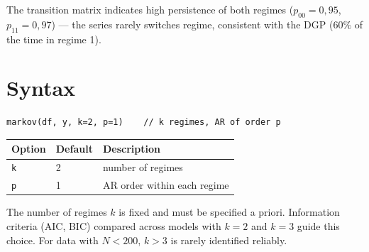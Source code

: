The transition matrix indicates high persistence of both regimes
($p_{00} = 0{,}95$, $p_{11} = 0{,}97$) — the series rarely switches regime,
consistent with the DGP ($60\%$ of the time in regime 1).

\section{Syntax}

\begin{lstlisting}
markov(df, y, k=2, p=1)    // k regimes, AR of order p
\end{lstlisting}

\begin{center}
\begin{tabular}{lll}
\toprule
\textbf{Option} & \textbf{Default} & \textbf{Description} \\
\midrule
\texttt{k} & 2 & number of regimes \\
\texttt{p} & 1 & AR order within each regime \\
\bottomrule
\end{tabular}
\end{center}

\begin{nota}
  The number of regimes $k$ is fixed and must be specified a priori.
  Information criteria (AIC, BIC) compared across models with $k=2$ and
  $k=3$ guide this choice. For data with $N < 200$, $k > 3$ is rarely
  identified reliably.
\end{nota}
